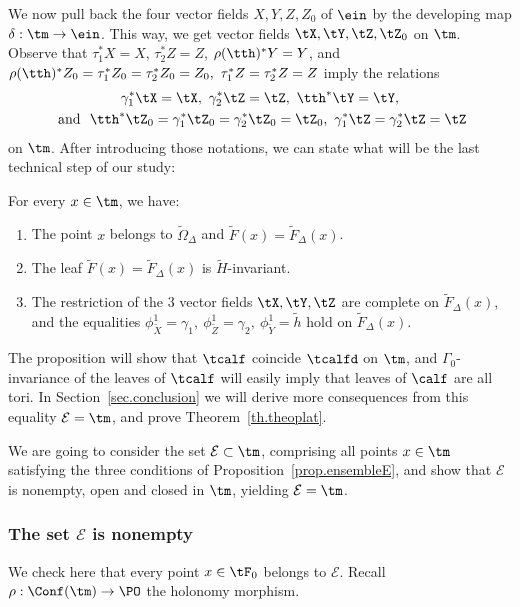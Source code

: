 We now pull back the four vector fields $X,Y,Z,Z_0$ of $\ein$ by the developing map $\delta: \tm \to \ein$. This way, we get vector fields $\tX,\tY, \tZ, \tZ_0$ on $\tm$. Observe that $\tau_1^*X=X$, $\tau_2^*Z=Z$, $\rho(\tth)^*Y=Y$, and $\rho(\tth)^*Z_0=\tau_1^*Z_0=\tau_2^*Z_0=Z_0, \ \tau_1^*Z=\tau_2^*Z=Z$ imply the relations
\begin{multline}\label{eq.vectorfields}
\gamma_1^*\tX=\tX,\ \gamma_2^*\tZ=\tZ, \ \tth^*\tY=\tY,\\
\text{ and }\ \tth^*\tZ_0=\gamma_1^*\tZ_0= \gamma_2^*\tZ_0=\tZ_0, \ \gamma_1^*\tZ= \gamma_2^*\tZ=\tZ
\end{multline}
on $\tm$. After introducing those notations, we can state what will be the last technical step of our study:

\begin{prop}\label{prop.ensembleE}
For every $x \in \tm$, we have:
\begin{enumerate}
\item \label{list8.17.1}The point $x$ belongs to $\tilde{\Omega}_{\Delta}$ and $\tilde{F}(x)=\tilde{F}_{\Delta}(x)$.
\item \label{list8.17.2}The leaf $\tilde{F}(x)=\tilde{F}_{\Delta}(x)$ is $\tilde{H}$-invariant.
\item \label{list8.17.3}The restriction of the $3$ vector fields $\tX,\tY,\tZ$ are complete on $\tilde{F}_{\Delta}(x)$, and the equalities $\phi_{\tilde{X}}^1=\gamma_1, \ \phi_{\tilde{Z}}^1=\gamma_2, \ \phi_{\tilde{Y}}^1=\tilde{h}$ hold on $\tilde{F}_{\Delta}(x)$.
\end{enumerate}
\end{prop}

The proposition will show that $\tcalf$ coincide $\tcalfd$ on $\tm$, and $\Gamma_{0}$-invariance of the leaves of $\tcalf$ will easily imply that leaves of $\calf$ are all tori. In Section~\ref{sec.conclusion} we will derive more consequences from this equality ${\mathcal E}=\tm$, and prove Theorem~\ref{th.theoplat}.

We are going to consider the set $\mathcal{E} \subset \tm$, comprising all points $x \in \tm$ satisfying the three conditions of Proposition~\ref{prop.ensembleE}, and show that $\mathcal{E}$ is nonempty, open and closed in $\tm$, yielding $\mathcal{E}=\tm$.



\subsubsection{The set \texorpdfstring{$\mathcal{E}$}{E} is nonempty}\label{sec.nonempty}
We check here that every point $x \in \tF_0$ belongs to $\mathcal{E}$. Recall $\rho: \Conf(\tm) \to \PO$ the holonomy morphism.

